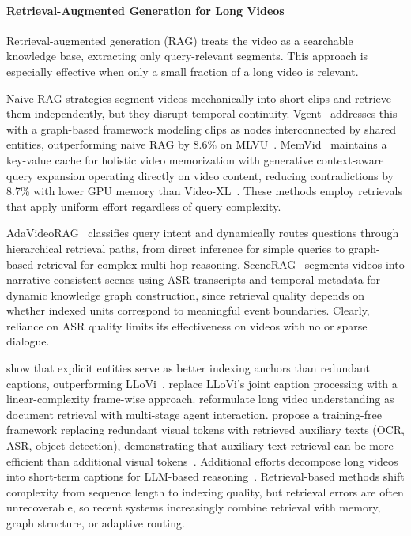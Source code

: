\documentclass[10pt]{article} %
\begin{document}
\paragraph{Retrieval-Augmented Generation for Long Videos}

Retrieval-augmented generation (RAG) treats the video as a searchable knowledge base, extracting only query-relevant segments. This approach is especially effective when only a small fraction of a long video is relevant.

Naive RAG strategies segment videos mechanically into short clips and retrieve them independently, but they disrupt temporal continuity. Vgent~\citep{Shen2025VgentGR} addresses this with a graph-based framework modeling clips as nodes interconnected by shared entities, outperforming naive RAG by 8.6\% on MLVU~\citep{zhou2025mlvu}. MemVid~\citep{Yuan2025MemoryenhancedRA} maintains a key-value cache for holistic video memorization with generative context-aware query expansion operating directly on video content, reducing contradictions by 8.7\% with lower GPU memory than Video-XL~\citep{shu2025video}. These methods employ retrievals that apply uniform effort regardless of query complexity.

AdaVideoRAG~\citep{Xue2025AdaVideoRAGOA} classifies query intent and dynamically routes questions through hierarchical retrieval paths, from direct inference for simple queries to graph-based retrieval for complex multi-hop reasoning. SceneRAG~\citep{Zeng2025SceneRAGSR} segments videos into narrative-consistent scenes using ASR transcripts and temporal metadata for dynamic knowledge graph construction, since retrieval quality depends on whether indexed units correspond to meaningful event boundaries. Clearly, reliance on ASR quality limits its effectiveness on videos with no or sparse dialogue.

\citet{Ranasinghe2024UnderstandingLV} show that explicit entities serve as better indexing anchors than redundant captions, outperforming LLoVi~\citep{Zhang2023ASL}. \citet{Goulas2024VidCtxCV} replace LLoVi's joint caption processing with a linear-complexity frame-wise approach. \citet{Ma2024DrVideoDR} reformulate long video understanding as document retrieval with multi-stage agent interaction. \citet{Luo2024VideoRAGVR} propose a training-free framework replacing redundant visual tokens with retrieved auxiliary texts (OCR, ASR, object detection), demonstrating that auxiliary text retrieval can be more efficient than additional visual tokens~\citep{Fan2024VideoAgentAM}. Additional efforts decompose long videos into short-term captions for LLM-based reasoning~\citep{Ataallah2024GoldfishVU}. Retrieval-based methods shift complexity from sequence length to indexing quality, but retrieval errors are often unrecoverable, so recent systems increasingly combine retrieval with memory, graph structure, or adaptive routing.
\end{document}
